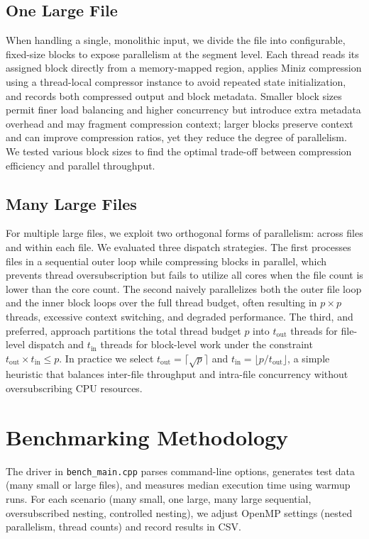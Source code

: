 \documentclass[10pt]{article}
\begin{document}
\subsection{One Large File}
When handling a single, monolithic input, we divide the file into configurable, fixed-size blocks to expose parallelism at the segment level. Each thread reads its assigned block directly from a memory-mapped region, applies Miniz compression using a thread-local compressor instance to avoid repeated state initialization, and records both compressed output and block metadata. Smaller block sizes permit finer load balancing and higher concurrency but introduce extra metadata overhead and may fragment compression context; larger blocks preserve context and can improve compression ratios, yet they reduce the degree of parallelism. We tested various block sizes to find the optimal trade-off between compression efficiency and parallel throughput.

\subsection{Many Large Files}
For multiple large files, we exploit two orthogonal forms of parallelism: across files and within each file. We evaluated three dispatch strategies. The first processes files in a sequential outer loop while compressing blocks in parallel, which prevents thread oversubscription but fails to utilize all cores when the file count is lower than the core count. The second naively parallelizes both the outer file loop and the inner block loops over the full thread budget, often resulting in $p \times p$ threads, excessive context switching, and degraded performance. The third, and preferred, approach partitions the total thread budget $p$ into $t_{\mathrm{out}}$ threads for file-level dispatch and $t_{\mathrm{in}}$ threads for block-level work under the constraint $t_{\mathrm{out}} \times t_{\mathrm{in}} \le p$. In practice we select $t_{\mathrm{out}} = \lceil\sqrt{p}\rceil$ and $t_{\mathrm{in}} = \lfloor p/t_{\mathrm{out}}\rfloor$, a simple heuristic that balances inter-file throughput and intra-file concurrency without oversubscribing CPU resources.

\section{Benchmarking Methodology}
The driver in \texttt{bench\_main.cpp} parses command-line options, generates test data (many small or large files), and measures median execution time using warmup runs. For each scenario (many small, one large, many large sequential, oversubscribed nesting, controlled nesting), we adjust OpenMP settings (nested parallelism, thread counts) and record results in CSV.
\end{document}
